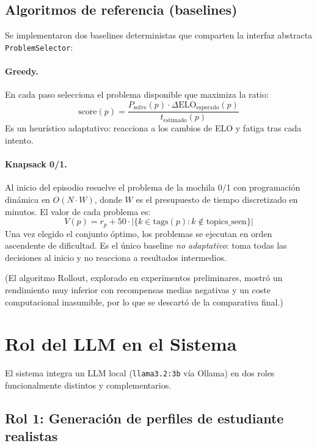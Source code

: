 \documentclass[12pt, a4paper]{article}
\begin{document}
\subsection{Algoritmos de referencia (baselines)}

Se implementaron dos baselines deterministas que comparten la interfaz
abstracta \texttt{ProblemSelector}:

\paragraph{Greedy.}
En cada paso selecciona el problema disponible que maximiza la ratio:
\[
  \text{score}(p) = \frac{P_{\text{solve}}(p) \cdot \Delta\text{ELO}_{\text{esperado}}(p)}{t_{\text{estimado}}(p)}
\]
Es un heurístico adaptativo: reacciona a los cambios de ELO y fatiga tras cada
intento.

\paragraph{Knapsack 0/1.}
Al inicio del episodio resuelve el problema de la mochila 0/1 con programación
dinámica en $O(N \cdot W)$, donde $W$ es el presupuesto de tiempo discretizado
en minutos. El valor de cada problema es:
\[
  V(p) = r_p + 50 \cdot |\{k \in \text{tags}(p) : k \notin \text{topics\_seen}\}|
\]
Una vez elegido el conjunto óptimo, los problemas se ejecutan en orden ascendente
de dificultad. Es el único baseline \textit{no adaptativo}: toma todas las
decisiones al inicio y no reacciona a resultados intermedios.

(El algoritmo Rollout, explorado en experimentos preliminares, mostró un
rendimiento muy inferior con recompensas medias negativas y un coste
computacional inasumible, por lo que se descartó de la comparativa final.)

\section{Rol del LLM en el Sistema}
\label{sec:llm}

El sistema integra un LLM local (\texttt{llama3.2:3b} vía Ollama) en dos
roles funcionalmente distintos y complementarios.

\subsection{Rol 1: Generación de perfiles de estudiante realistas}
\end{document}
